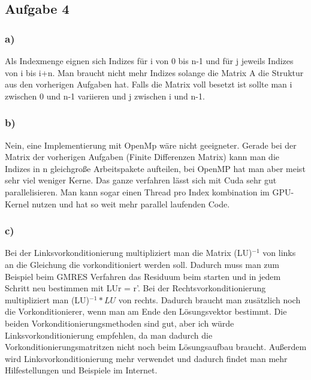 \documentclass{article}
\begin{document}
\subsection{Aufgabe 4}

\subsubsection{a)}
Als Indexmenge eignen sich Indizes für i von 0 bis n-1 und für j jeweils Indizes von i bis i+n. Man braucht nicht mehr Indizes solange die Matrix A die Struktur aus den vorherigen Aufgaben hat. Falls die Matrix voll besetzt ist sollte man i zwischen 0 und n-1 variieren und j zwischen i und n-1.

\subsubsection{b)}
Nein, eine Implementierung mit OpenMp wäre nicht geeigneter. Gerade bei der Matrix der vorherigen Aufgaben (Finite Differenzen Matrix) kann man die Indizes in n gleichgroße Arbeitspakete aufteilen, bei OpenMP hat man aber meist sehr viel weniger Kerne. Das ganze verfahren lässt sich mit Cuda sehr gut parallelisieren. Man kann sogar einen Thread pro Index kombination im GPU-Kernel nutzen und hat so weit mehr parallel laufenden Code.

\subsubsection{c)}
Bei der Linksvorkonditionierung multipliziert man die Matrix (LU)$^{-1}$ von links an die Gleichung die vorkonditioniert werden soll. Dadurch muss man zum Beispiel beim GMRES Verfahren das Residuum beim starten und in jedem Schritt neu bestimmen mit LUr = r'. Bei der Rechtsvorkonditionierung multipliziert man (LU)$^{-1}*LU$ von rechts. Dadurch braucht man zusätzlich noch die Vorkonditionierer, wenn man am Ende den Lösungsvektor bestimmt. 
Die beiden Vorkonditionierungsmethoden sind gut, aber ich würde Linksvorkonditionierung empfehlen, da man dadurch die Vorkonditionierungsmatritzen nicht noch beim Lösungsaufbau braucht. Außerdem wird Linksvorkonditionierung mehr verwendet und dadurch findet man mehr Hilfestellungen und Beispiele im Internet.
\end{document}
